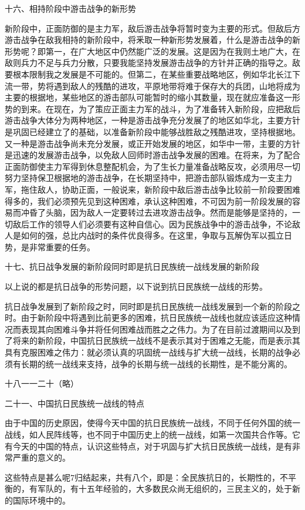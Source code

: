 十六、相持阶段中游击战争的新形势

新阶段中，正面防御的是主力军，敌后游击战争将暂时变为主要的形式。但敌后方游击战争在敌我相持的新阶段中，将釆取一种新形势发展着，什么是游击战争的新形势呢？即第一，在广大地区中仍然能广泛的发展。这是因为在我则土地广大，在敌则兵力不足与兵力分散，只要我能坚持发展游击战争的方针并正确的指导之。敌要根本限制我之发展是不可能的。但第二，在某些重要战略地区，例如华北长江下流一带，势将遇到敌人的残酷的进攻，平原地带将难于保存大的兵团，山地将成为主要的根据地，某些地区的游击部队可能暂时的缩小其数量，现在就应准备这一形势的到来。在现在，为了策应正面主力军的战斗，为了准备转入新阶段，应把敌后游击战争大体分为两种地区，一种是游击战争充分发展了的地区如华北，主要方针是巩固已经建立了的基础，以准备新阶段中能够战胜敌之残酷进攻，坚持根据地。又一种是游击战争尚未充分发展，或正开始发展的地区，如华中一带，主要的方针是迅速的发展游击战争，以免敌人回师时游击战争发展的困难。在将来，为了配合正面防御使主力军得到休息整配机会，为了生长力量准备战略反攻，必须用尽一切努力坚持保卫根据地的游击战争，在长期坚持中，把游击部队锻炼成为一支主力军，拖住敌人，协助正面，一般说来，新阶段中敌后游击战争比较前一阶段要困难得多的，我们必须预先见到这种困难，承认这种困难，不可因为前一阶段发展的容易而冲昏了头脑，因为敌人一定要转过去进攻游击战争。然而是能够是坚持的，一切敌后工作的领导人们必须要有这种自信心。因为民族战争中的游击战争，不论敌人是如何的强，总比内战时的条件优良得多。在这里，争取与瓦解伪军以孤立日势，是非常重要的任务。

十七、抗日战争发展的新阶段同时即是抗日民族统一战线发展的新阶段

以上说的都是抗日战争的形势问题，以下说到抗日民族统一战线的形势。

抗日战争发展到了新阶段之时，同时即是抗日民族统一战线发展到一个新的阶段之时。由于新阶段中将遇到比前更多的困难，抗日民族统一战线也就应该适应这种情况而表现其向困难斗争并将任何困难战而胜之之伟力。为了在目前过渡期间以及到了将来的新阶段，中国抗日民族统一战线不是表示其对于困难之无能，而是表示其具有克服困难之伟力：就必须认真的巩固统一战线与扩大统一战线，长期的战争必须有长期的统一战线来支持，战争的长期与统一战线的长期性，是不能分离的。

十八一一二十（略）

二十一、中国抗日民族统一战线的特点

由于中国的历史原因，使得今天中国的抗日民族统一战线，不同于任何外国的统一战线，如人民阵线等，也不同于中国历史上的统一战线，如第一次国共合作等。它有今天的中国的特点，认识这些特点，对于巩固与扩大抗日民族统一战线，是有非常严重的意义的。

这些特点是甚么呢7归结起来，共有八个，即是：全民族抗日的，长期性的，不平衡的，有军队的，有十五年经验的，大多数民众尚无组织的，三民主义的，处于新的国际环境中的。

